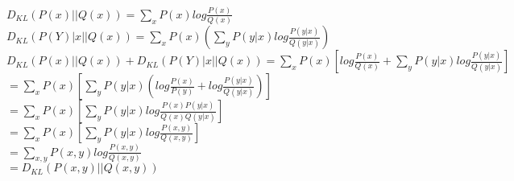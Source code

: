 \begin{answer}\\
$D_{KL}(P(x)||Q(x))=\sum_{x}P(x)log \frac{P(x)}{Q(x)}$\\
$D_{KL}(P(Y)|x||Q(x))=\sum_{x}P(x)(\sum_y P(y|x)log \frac{P(y|x)}{Q(y|x)})$\\
$D_{KL}(P(x)||Q(x))+D_{KL}(P(Y)|x||Q(x))=\sum_{x}P(x) \left[ log \frac{P(x)}{Q(x)}+ \sum_y P(y|x)log \frac{P(y|x)}{Q(y|x)}\right]$\\
$=\sum_{x}P(x)\left[ \sum_y P(y|x)(log \frac{P(x)}{P(y)}+log \frac{P(y|x)}{Q(y|x)}) \right]$\\
$=\sum_{x}P(x)\left[ \sum_y P(y|x) log \frac{P(x)P(y|x)}{Q(x)Q(y|x)} \right]$\\
$=\sum_{x}P(x)\left[ \sum_y P(y|x) log \frac{P(x,y)}{Q(x,y)} \right]$\\
$=\sum_{x,y}P(x,y)log\frac{P(x,y)}{Q(x,y)}$\\
$=D_{KL}(P(x,y)||Q(x,y))$\\
\end{answer}
